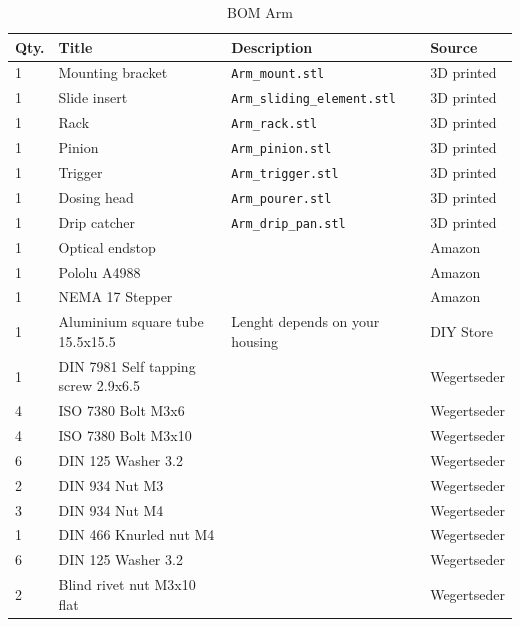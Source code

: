 \documentclass[a4paper]{scrartcl}
\begin{document}
\begin{table}
\caption{BOM Arm}
\begin{tabular}{|l|l|l|l|}
\hline
Qty. & Title & Description & Source\\
\hline\hline
1 & Mounting bracket & \texttt{Arm\_mount.stl} & 3D printed\\
\hline
1 & Slide insert & \texttt{Arm\_sliding\_element.stl} & 3D printed\\
\hline
1 & Rack & \texttt{Arm\_rack.stl}  & 3D printed\\
\hline
1 & Pinion & \texttt{Arm\_pinion.stl}  & 3D printed\\
\hline
1 & Trigger & \texttt{Arm\_trigger.stl} & 3D printed\\
\hline
1 & Dosing head & \texttt{Arm\_pourer.stl} & 3D printed\\
\hline
1 & Drip catcher & \texttt{Arm\_drip\_pan.stl}  & 3D printed\\
\hline
1 & Optical endstop &  & Amazon\\
\hline 
1 & Pololu A4988 & & Amazon\\
\hline 
1 & NEMA 17 Stepper & & Amazon\\
\hline
1 & Aluminium square tube 15.5x15.5 & Lenght depends on your housing& DIY Store\\
\hline
1& DIN 7981 Self tapping screw 2.9x6.5  & & Wegertseder\\
\hline
4 & ISO 7380 Bolt M3x6  & & Wegertseder\\
\hline
4 & ISO 7380 Bolt M3x10  & & Wegertseder\\
\hline
6 & DIN 125 Washer 3.2  & & Wegertseder\\
\hline
2 & DIN 934 Nut M3 & & Wegertseder\\
\hline
3 & DIN 934 Nut M4 & & Wegertseder\\
\hline
1 & DIN 466 Knurled nut M4 &  & Wegertseder\\
\hline 
6 & DIN 125 Washer 3.2  & & Wegertseder\\
\hline
2 & Blind rivet nut M3x10 flat & & Wegertseder\\
\hline 

\end{tabular}
\end{table}
\end{document}

